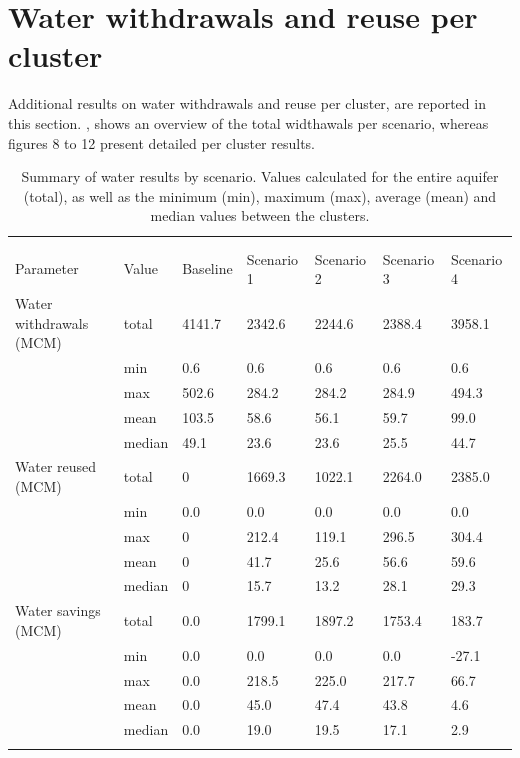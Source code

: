 \documentclass[12pt]{iopart}
\begin{document}
\section{Water withdrawals and reuse per cluster}
Additional results on water withdrawals and reuse per cluster, are reported in this section. , shows an overview of the total widthawals per scenario, whereas figures 8 to 12 present detailed per cluster results.
\begin{table}[!ht]
	\caption{\label{tbl:resultswater}Summary of water results by scenario. Values calculated for the entire aquifer (total), as well as the minimum (min), maximum (max), average (mean) and median values between the clusters.}
	\footnotesize
	\lineup
	\begin{tabular*}{\textwidth}{@{}*{7}{l}}
		\br
		&        & \centre{5}{Scenario} \\
		\ns
		&        & \crule{5} \\
		Parameter & Value  &  Baseline &  Scenario 1 &  Scenario 2 &  Scenario 3 &  Scenario 4 \\
		\mr
		Water withdrawals (MCM) & total &    4141.7 &      2342.6 &      2244.6 &      2388.4 &      3958.1 \\
		& min &       0.6 &         0.6 &         0.6 &         0.6 &         0.6 \\
		& max &     502.6 &       284.2 &       284.2 &       284.9 &       494.3 \\
		& mean &     103.5 &        58.6 &        56.1 &        59.7 &        99.0 \\
		& median &      49.1 &        23.6 &        23.6 &        25.5 &        44.7 \\
		Water reused (MCM) & total &    0 &      1669.3 &      1022.1 &      2264.0 &      2385.0 \\
		& min &       0.0 &         0.0 &         0.0 &         0.0 &         0.0 \\
		& max &     0 &       212.4 &       119.1 &       296.5 &       304.4 \\
		& mean &      0 &        41.7 &        25.6 &        56.6 &        59.6 \\
		& median &      0 &        15.7 &        13.2 &        28.1 &        29.3 \\
		Water savings (MCM) & total &       0.0 &      1799.1 &      1897.2 &      1753.4 &       183.7 \\
		& min &       0.0 &         0.0 &         0.0 &         0.0 &       -27.1 \\
		& max &       0.0 &       218.5 &       225.0 &       217.7 &        66.7 \\
		& mean &       0.0 &        45.0 &        47.4 &        43.8 &         4.6 \\
		& median &       0.0 &        19.0 &        19.5 &        17.1 &         2.9 \\
		\br
	\end{tabular*}
\end{table}
\end{document}
